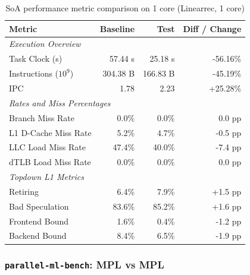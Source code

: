 \documentclass[leqno,11pt]{article}
\begin{document}
\begin{table}[htbp]
      \centering
      \caption{SoA performance metric comparison on 1 core (Linearrec, 1 core)}
      \label{tab:perf_comparison_soa_linearrec_1core}
      \begin{tabular}{lrrr}
        \toprule
        \textbf{Metric} & \textbf{Baseline} & \textbf{Test} & \textbf{Diff / Change} \\
        \midrule
        \multicolumn{4}{l}{\textit{Execution Overview}} \\
        \quad Task Clock (s)           & 57.44 s   & 25.18 s   & -56.16\%   \\
        \quad Instructions ($10^9$)    & 304.38 B  & 166.83 B  & -45.19\%   \\
        \quad IPC                      & 1.78       & 2.23       & +25.28\%    \\
        \midrule
        \multicolumn{4}{l}{\textit{Rates and Miss Percentages}} \\
        \quad Branch Miss Rate         & 0.0\%      & 0.0\%      & 0.0 pp     \\
        \quad L1 D-Cache Miss Rate     & 5.2\%      & 4.7\%      & -0.5 pp    \\
        \quad LLC Load Miss Rate       & 47.4\%     & 40.0\%     & -7.4 pp    \\
        \quad dTLB Load Miss Rate      & 0.0\%      & 0.0\%      & 0.0 pp     \\
        \midrule
        \multicolumn{4}{l}{\textit{Topdown L1 Metrics}} \\
        \quad Retiring                 & 6.4\%      & 7.9\%      & +1.5 pp    \\
        \quad Bad Speculation          & 83.6\%     & 85.2\%     & +1.6 pp   \\
        \quad Frontend Bound           & 1.6\%      & 0.4\%      & -1.2 pp    \\
        \quad Backend Bound            & 8.4\%      & 6.5\%      & -1.9 pp    \\
        \bottomrule
      \end{tabular}
    \end{table}


\subsubsection{\texttt{parallel-ml-bench}: MPL vs MPL}
\end{document}
